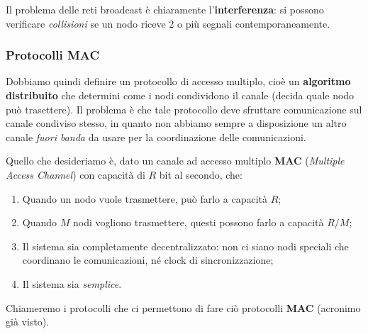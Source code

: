 \documentclass[a4paper,11pt]{article}
\begin{document}
Il problema delle reti broadcast è chiaramente l'\textbf{interferenza}: si possono verificare \textit{collisioni} se un nodo riceve 2 o più segnali contemporaneamente.

\subsubsection{Protocolli MAC}
Dobbiamo quindi definire un protocollo di accesso multiplo, cioè un \textbf{algoritmo distribuito} che determini come i nodi condividono il canale (decida quale nodo può trasettere).
Il problema è che tale protocollo deve sfruttare comunicazione sul canale condiviso stesso, in quanto non abbiamo sempre a disposizione un altro canale \textit{fuori banda} da usare per la coordinazione delle comunicazioni. 

Quello che desideriamo è, dato un canale ad accesso multiplo \textbf{MAC} (\textit{Multiple Access Channel}) con capacità di $R$ bit al secondo, che:
\begin{enumerate}
	\item Quando un nodo vuole trasmettere, può farlo a capacità $R$;
	\item Quando $M$ nodi vogliono trasmettere, questi possono farlo a capacità $R/M$;
	\item Il sistema sia completamente decentralizzato: non ci siano nodi speciali che coordinano le comunicazioni, né clock di sincronizzazione;
	\item Il sistema sia \textit{semplice}.
\end{enumerate}

Chiameremo i protocolli che ci permettono di fare ciò protocolli \textbf{MAC} (acronimo già visto).
\end{document}
